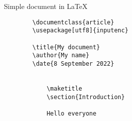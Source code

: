 

\begin{frame}[fragile]{Simple document in \LaTeX}
	\begin{verbatim} 
		\documentclass{article}
		\usepackage[utf8]{inputenc}
		
		\title{My document}
		\author{My name}
		\date{8 September 2022}
		
		
			\maketitle
			\section{Introduction}
			
			Hello everyone
		
	\end{verbatim}

\end{frame}
